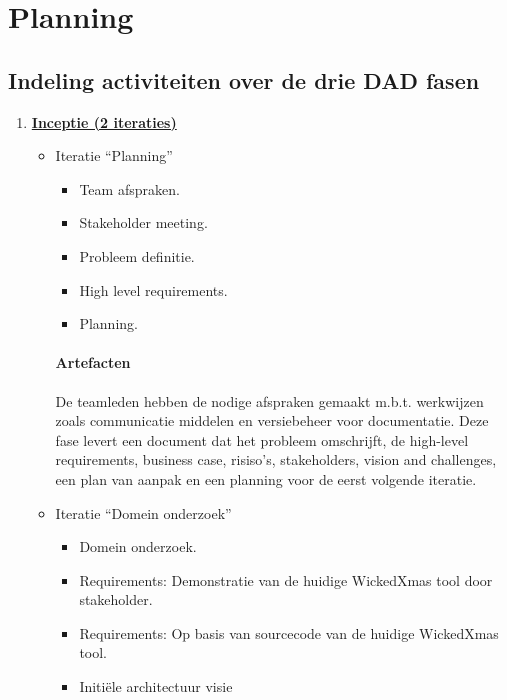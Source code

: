 
\section{Planning}
\subsection{Indeling activiteiten over de drie DAD fasen}
\begin{enumerate}
\item \underline{\textbf{Inceptie (2 iteraties)}}
		\begin{itemize}
		\item Iteratie ``Planning''
			\begin{itemize}
			\item Team afspraken.
			\item Stakeholder meeting.
			\item Probleem definitie.
			\item High level requirements.
			\item Planning.
			\end{itemize}
		\paragraph{Artefacten}
		De teamleden hebben de nodige afspraken gemaakt m.b.t. werkwijzen zoals
		communicatie middelen en versiebeheer voor documentatie. Deze fase levert
		een document dat het probleem omschrijft,  de high-level requirements,
		business case, risiso's, stakeholders, vision and challenges, een plan van
		aanpak en een planning voor de eerst volgende iteratie.
		\item Iteratie ``Domein onderzoek''
			\begin{itemize}
			\item Domein onderzoek.
			\item Requirements: Demonstratie van de huidige WickedXmas tool door
			stakeholder.
			\item Requirements: Op basis van sourcecode van de huidige WickedXmas tool.
			\item Initi\"ele architectuur visie
			\end{itemize}

\end{itemize}
\end{enumerate}
